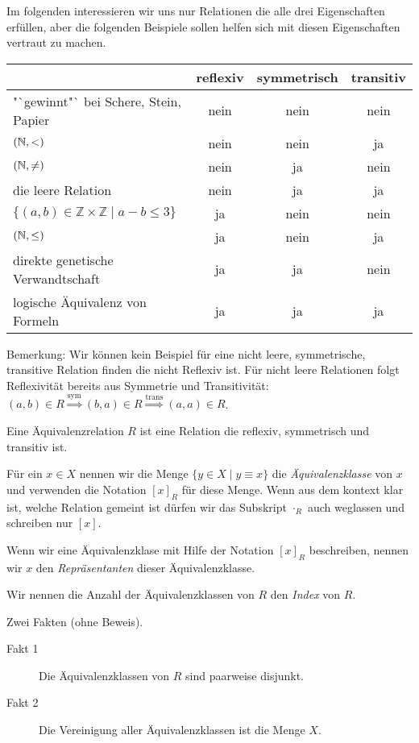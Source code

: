 \begin{Bsp} Im folgenden interessieren wir uns nur Relationen die alle drei Eigenschaften erfüllen, 
aber die folgenden Beispiele sollen helfen sich mit diesen Eigenschaften vertraut zu machen.

\begin{center}
\begin{tabular}{lccc}
& reflexiv & symmetrisch & transitiv\\ \hline
"`gewinnt"` bei Schere, Stein, Papier & nein & nein & nein\\
$(\mathbb{N}, <)$ & nein & nein & ja\\
$(\mathbb{N}, \neq)$ & nein & ja & nein\\
die leere Relation & nein & ja & ja\\
$\{(a,b)\in\mathbb{Z}\times\mathbb{Z}\mid a-b\leq 3\}$ & ja & nein & nein\\
$(\mathbb{N}, \leq)$& ja & nein & ja\\
direkte genetische Verwandtschaft & ja & ja & nein\\
logische Äquivalenz von Formeln & ja & ja & ja\\
\end{tabular}
\end{center}
Bemerkung: Wir können kein Beispiel für eine nicht leere, symmetrische, transitive Relation finden die nicht Reflexiv ist.
Für nicht leere Relationen folgt Reflexivität bereits aus Symmetrie und Transitivität: 
$(a,b)\in R\stackrel{\text{sym}}{\Rightarrow} (b,a)\in R\stackrel{\text{trans}}{\Rightarrow} (a,a)\in R$.

\end{Bsp}

\begin{Def}
Eine Äquivalenzrelation $R$ ist eine Relation die reflexiv, symmetrisch und transitiv ist.

Für ein $x\in X$ nennen wir die Menge $\{y\in X \mid y \equiv x\}$ die \emph{Äquivalenzklasse} von $x$
und verwenden die Notation $[x]_R$ für diese Menge.
Wenn aus dem kontext klar ist, welche Relation gemeint ist dürfen wir das Subskript $\cdot_R$ auch weglassen und schreiben nur $[x]$.

Wenn wir eine Äquivalenzklase mit Hilfe der Notation $[x]_R$ beschreiben, nennen wir $x$ den \emph{Repräsentanten} dieser Äquivalenzklasse.

Wir nennen die Anzahl der Äquivalenzklassen von $R$ den \emph{Index} von $R$.
\end{Def}

Zwei Fakten (ohne Beweis).
\begin{description}
 \item[Fakt 1] Die Äquivalenzklassen von $R$ sind paarweise disjunkt.
 \item[Fakt 2] Die Vereinigung aller Äquivalenzklassen ist die Menge $X$.
\end{description}

